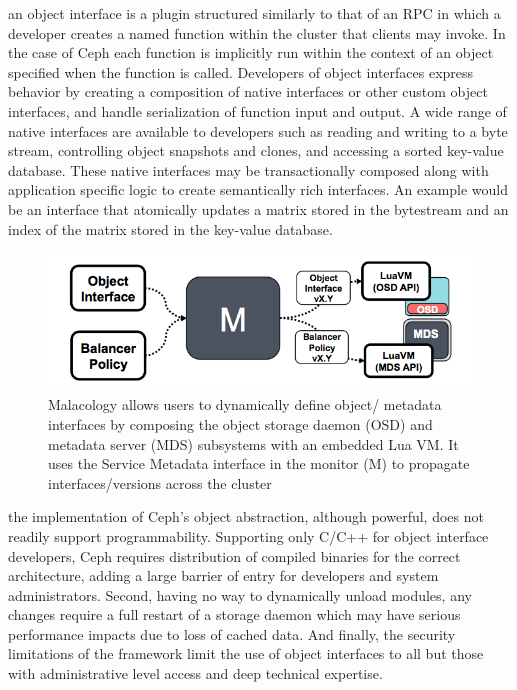  an object
interface is a plugin structured similarly to that of an RPC in which a
developer creates a named function within the cluster that clients may invoke.
In the case of Ceph each function is implicitly run within the context of an
object specified when the function is called. Developers of object interfaces
express behavior by creating a composition of native interfaces or other custom
object interfaces, and handle serialization of function input and output.  A
wide range of native interfaces are available to developers such as reading and
writing to a byte stream, controlling object snapshots and clones, and
accessing a sorted key-value database. These native interfaces may be
transactionally composed along with application specific logic to create
semantically rich interfaces. An example would be an interface that atomically
updates a matrix stored in the bytestream and an index of the matrix stored in
the key-value database.\\

\begin{figure}[tbp]
\centering
\includegraphics{figures/implementation.png}
\caption{Malacology allows users to dynamically define
object/ metadata interfaces by composing the object
storage daemon (OSD) and metadata server (MDS) subsystems with an embedded Lua
VM.  It uses the Service Metadata interface in the monitor (M) to propagate
interfaces/versions across the cluster \label{fig:implementation}}
\end{figure}

 the implementation of Ceph's object
abstraction, although powerful, does not readily support programmability.
Supporting only C/C++ for object interface developers, Ceph requires
distribution of compiled binaries for the correct architecture, adding a large
barrier of entry for developers and system administrators. Second, having no
way to dynamically unload modules, any changes require a full restart of a
storage daemon which may have serious performance impacts due to loss of cached
data. And finally, the security limitations of the framework limit the use of
object interfaces to all but those with administrative level access and deep
technical expertise.

